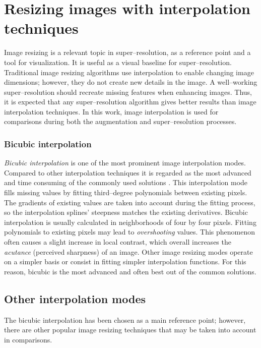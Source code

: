 \section{Resizing images with interpolation techniques}
Image resizing is a relevant topic in super--resolution, as a reference point and a tool for visualization.
It is useful as a visual baseline for super--resolution.
Traditional image resizing algorithms use interpolation to enable changing image dimensions; however, they do not create new details in the image.
A well--working super--resolution should recreate missing features when enhancing images.
Thus, it is expected that any super--resolution algorithm gives better results than image interpolation techniques.
In this work, image interpolation is used for comparisons during both the augmentation and super--resolution processes.

\subsubsection{Bicubic interpolation}
\textit{Bicubic interpolation} is one of the most prominent image interpolation modes.
Compared to other interpolation techniques it is regarded as the most advanced and time consuming of the commonly used solutions \cite{han-2013-interpolation} \cite{teoh-2008-inrepolation}.
This interpolation mode fills missing values by fitting third--degree polynomials between existing pixels.
The gradients of existing values are taken into account during the fitting process, so the interpolation splines' steepness matches the existing derivatives.
Bicubic interpolation is usually calculated in neighborhoods of four by four pixels.
Fitting polynomials to existing pixels may lead to \textit{overshooting} values.
This phenomenon often causes a slight increase in local contrast, which overall increases the \textit{acutance} (perceived sharpness) of an image.
Other image resizing modes operate on a simpler basis or consist in fitting simpler interpolation functions.
For this reason, bicubic is the most advanced and often best out of the common solutions.

\subsection{Other interpolation modes}
The bicubic interpolation has been chosen as a main reference point; however, there are other popular image resizing techniques that may be taken into account in comparisons.

